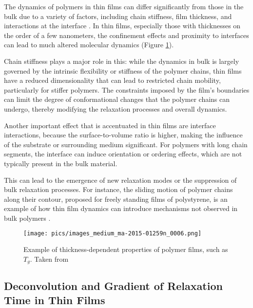 The dynamics of polymers in thin films can differ significantly from those in the bulk due to a variety of factors, including chain stiffness, film thickness, and interactions at the interface \cite{LI2021101431}. In thin films, especially those with thicknesses on the order of a few nanometers, the confinement effects and proximity to interfaces can lead to much altered molecular dynamics (Figure \ref{dyn}).

Chain stiffness plays a major role in this: while the dynamics in bulk is largely governed by the intrinsic flexibility or stiffness of the polymer chains, thin films have a reduced dimensionality that can lead to restricted chain mobility, particularly for stiffer polymers. The constraints imposed by the film's boundaries can limit the degree of conformational changes that the polymer chains can undergo, thereby modifying the relaxation processes and overall dynamics.

Another important effect that is accentuated in thin films are interface interactions, because the surface-to-volume ratio is higher, making the influence of the substrate or surrounding medium significant. For polymers with long chain segments, the interface can induce orientation or ordering effects, which are not typically present in the bulk material. %

This can lead to the emergence of new relaxation modes or the suppression of bulk relaxation processes. For instance, the sliding motion of polymer chains along their contour, proposed for freely standing films of polystyrene, is an example of how thin film dynamics can introduce mechanisms not observed in bulk polymers \cite{yin2015}.

\begin{figure}[htp!]
    \centering
    \hspace*{-0.8cm}
    \texttt{[image: pics/images\_medium\_ma-2015-01259n\_0006.png]}
    \caption{Example of thickness-dependent properties of polymer films, such as $T_g$. Taken from \cite{yin2015}}
    \label{dyn}
\end{figure}


\subsection{Deconvolution and Gradient of Relaxation Time in Thin Films}

